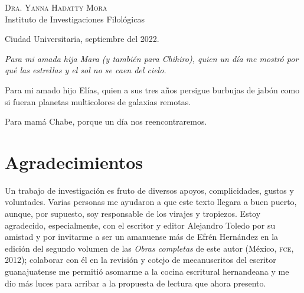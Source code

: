 \documentclass[14pt,twoside,final]{extbook} %
\begin{document}
\begin{center}
\large\textsc{Dra. Yanna Hadatty Mora} \\

Instituto de Investigaciones Filológicas
\end{center}
\vfill
\begin{center}
\large Ciudad Universitaria, septiembre del 2022.
\end{center}
\newpage
\pagestyle{empty}
\null\vfill
\newpage
\pagestyle{empty}
\protect{}
{}
\vspace*{42pt}
\begin{flushright}
\begin{minipage}{7.5cm}
\em Para mi amada hija Mara (y también para Chihiro), quien un día me mostró por qué las estrellas y el sol no se caen del cielo.
\begin{center}
\end{center}
Para mi amado hijo Elías, quien a sus tres años persigue burbujas de jabón como si fueran planetas multicolores de galaxias remotas.
\begin{center}
\end{center}
Para mamá Chabe, porque un día nos reencontraremos.
\end{minipage}
\end{flushright}
\newpage
\pagestyle{empty}
\null\vfill
\chapter*{Agradecimientos}\label{ch:agradecimientos}
\thispagestyle{empty}
\pagestyle{fancy}
\fancyhf{} %
\fancyhead[LE,RO]{\thepage}
\renewcommand{\headrulewidth}{0pt}
Un trabajo de investigación es fruto de diversos apoyos, complicidades, gustos y voluntades. Varias personas me ayudaron a que este texto llegara a buen puerto, aunque, por supuesto, soy responsable de los virajes y tropiezos. Estoy agradecido, especialmente, con el escritor y editor Alejandro Toledo por su amistad y por invitarme a ser un amanuense más de Efrén Hernández en la edición del segundo volumen de las \emph{Obras completas} de este autor (México, \textsc{fce}, 2012); colaborar con él en la revisión y cotejo de mecanuscritos del escritor guanajuatense me permitió asomarme a la cocina escritural hernandeana y me dio más luces para arribar a la propuesta de lectura que ahora presento.
\end{document}
